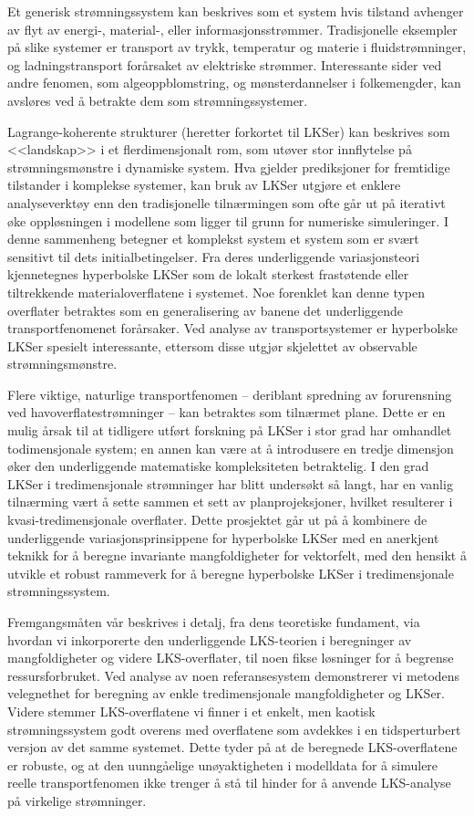 \begingroup
\vspace{3mm}
Et generisk strømningssystem kan beskrives som et system hvis tilstand
avhenger av flyt av energi-, material-, eller informasjonsstrømmer.
Tradisjonelle eksempler på slike systemer er transport av trykk, temperatur og
materie i fluidstrømninger, og ladningstransport forårsaket av elektriske
strømmer. Interessante sider ved andre fenomen, som algeoppblomstring, og
mønsterdannelser i folkemengder, kan avsløres ved å betrakte dem som
strømningssystemer.

Lagrange-koherente strukturer (heretter forkortet til LKSer) kan beskrives som
<<landskap>> i et flerdimensjonalt rom, som utøver stor innflytelse på
strømningsmønstre i dynamiske system. Hva gjelder prediksjoner for fremtidige
tilstander i komplekse systemer, kan bruk av LKSer utgjøre et enklere
analyseverktøy enn den tradisjonelle tilnærmingen som ofte går ut på iterativt
øke oppløsningen i modellene som ligger til grunn for numeriske simuleringer.
I denne sammenheng betegner et komplekst system
et system som er svært sensitivt til dets initialbetingelser. Fra deres
underliggende variasjonsteori kjennetegnes hyperbolske LKSer som de lokalt
sterkest frastøtende eller tiltrekkende materialoverflatene i systemet. Noe
forenklet kan denne typen overflater betraktes som en generalisering av banene
det underliggende transportfenomenet forårsaker. Ved analyse av
transportsystemer er hyperbolske LKSer spesielt interessante, ettersom disse
utgjør skjelettet av observable strømningsmønstre.

Flere viktige, naturlige transportfenomen -- deriblant spredning av
forurensning ved havoverflatestrømninger -- kan betraktes som
tilnærmet plane. Dette er en mulig årsak til at tidligere utført forskning på
LKSer i stor grad har omhandlet todimensjonale system; en annen kan være at å
introdusere en tredje dimensjon øker den underliggende matematiske
kompleksiteten betraktelig. I den grad LKSer i tredimensjonale strømninger har
blitt undersøkt så langt, har en vanlig tilnærming vært å sette sammen et sett
av planprojeksjoner, hvilket resulterer i kvasi-tredimensjonale overflater.
Dette prosjektet går ut på å kombinere de underliggende variasjonsprinsippene
for hyperbolske LKSer med en anerkjent teknikk for å beregne invariante
mangfoldigheter for vektorfelt, med den hensikt å utvikle et robust rammeverk
for å beregne hyperbolske LKSer i tredimensjonale strømningssystem.

Fremgangsmåten vår beskrives i detalj, fra dens teoretiske fundament, via
hvordan vi inkorporerte den underliggende LKS-teorien i beregninger av
mangfoldigheter og videre LKS-overflater, til noen fikse løsninger for å
begrense ressursforbruket. Ved analyse av noen referansesystem demonstrerer vi
metodens velegnethet for beregning av enkle tredimensjonale mangfoldigheter og
LKSer. Videre stemmer LKS-overflatene vi finner i et enkelt, men kaotisk
strømningssystem godt overens med overflatene som avdekkes i en tidsperturbert
versjon av det samme systemet. Dette tyder på at de beregnede LKS-overflatene
er robuste, og at den uunngåelige unøyaktigheten i modelldata for å simulere
reelle transportfenomen ikke trenger å stå til hinder for å anvende LKS-analyse
på virkelige strømninger.

